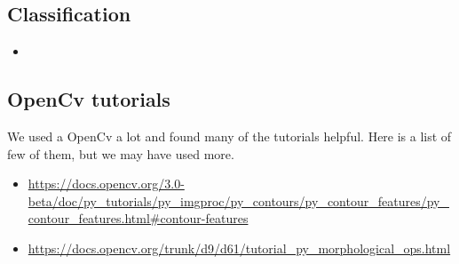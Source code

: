 \documentclass[Report.tex]{subfiles}
\begin{document}
\subsection{Classification}
\begin{itemize}
    \item 
\end{itemize}

\subsection{OpenCv tutorials}
We used a OpenCv a lot and found many of the tutorials helpful. Here is a list of few of them, but we may have used more.  
\begin{itemize}
    \item \href{https://docs.opencv.org/3.0-beta/doc/py_tutorials/py_imgproc/py_contours/py_contour_features/py_contour_features.html#contour-features}{https://docs.opencv.org/3.0-beta/doc/py\_tutorials/py\_imgproc/py\_contours/py\_contour\_features/py\_contour\_features.html#contour-features}
    \item \href{https://docs.opencv.org/trunk/d9/d61/tutorial_py_morphological_ops.html}{https://docs.opencv.org/trunk/d9/d61/tutorial\_py\_morphological\_ops.html}
\end{itemize}
\end{document}
